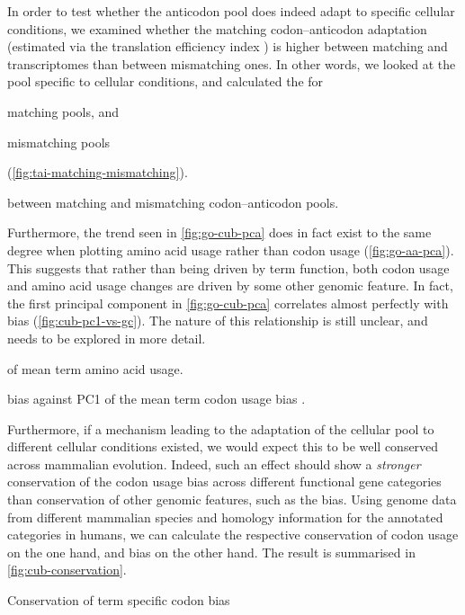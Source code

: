 In order to test whether the anticodon pool does indeed adapt to specific
cellular conditions, we examined whether the matching codon--anticodon
adaptation (estimated via the translation efficiency index \tai) is higher
between matching \mrna and \trna transcriptomes than between mismatching ones.
In other words, we looked at the \mrna pool specific to cellular conditions, and
calculated the \tai[s] for
\begin{enumerate*}
    \item matching \trna pools, and
    \item mismatching \trna pools
\end{enumerate*}
(\cref{fig:tai-matching-mismatching}).

    {\tai between matching and mismatching codon--anticodon pools.}
    {}


Furthermore, the trend seen in \cref{fig:go-cub-pca} does in fact exist to the
same degree when plotting amino acid usage rather than codon usage
(\cref{fig:go-aa-pca}). This suggests that rather than being driven by \go term
function, both codon usage and amino acid usage changes are driven by some other
genomic feature. In fact, the first principal component in \cref{fig:go-cub-pca}
correlates almost perfectly with \gc bias (\cref{fig:cub-pc1-vs-gc}). The nature
of this relationship is still unclear, and needs to be explored in more detail.

    {\pca of mean \go term amino acid usage.}
    {}

    {\gc bias against PC1 of the mean \go term codon usage bias \pca.}
    {}

Furthermore, if a mechanism leading to the adaptation of the cellular \trna pool
to different cellular conditions existed, we would expect this to be well
conserved across mammalian evolution. Indeed, such an effect should show a
\emph{stronger} conservation of the codon usage bias across different functional
gene categories than conservation of other genomic features, such as the \gc
bias. Using genome data from different mammalian species and homology
information for the annotated \go categories in humans, we can calculate the
respective conservation of codon usage on the one hand, and \gc bias on the
other hand. The result is summarised in \cref{fig:cub-conservation}.

    {Conservation of \go term specific codon bias}
    {}
